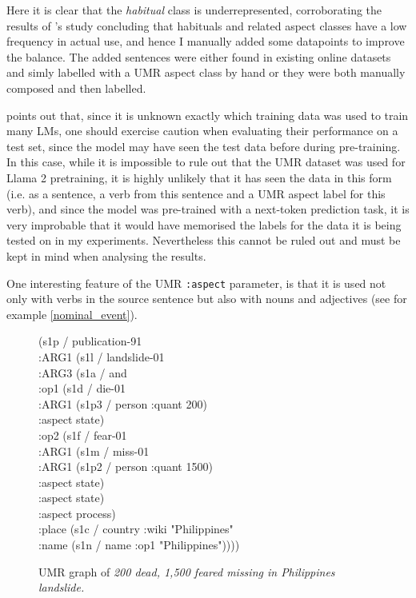 Here it is clear that the \emph{habitual} class is underrepresented, corroborating the results of \citet{Dahl1985TenseAA}'s study concluding that habituals and related aspect classes have a low frequency in actual use, and hence I manually added some datapoints to improve the balance. The added sentences were either found in existing online datasets and simly labelled with a UMR aspect class by hand or they were both manually composed and then labelled.

\citet{törnberg2024best} points out that, since it is unknown exactly which training data was used to train many LMs, one should exercise caution when evaluating their performance on a test set, since the model may have seen the test data before during pre-training. In this case, while it is impossible to rule out that the UMR dataset was used for Llama 2 pretraining, it is highly unlikely that it has seen the data in this form (i.e. as a sentence, a verb from this sentence and a UMR aspect label for this verb), and since the model was pre-trained with a next-token prediction task, it is very improbable that it would have memorised the labels for the data it is being tested on in my experiments. Nevertheless this cannot be ruled out and must be kept in mind when analysing the results.

One interesting feature of the UMR \texttt{:aspect} parameter, is that it is used not only with verbs in the source sentence but also with nouns and adjectives (see for example \ref{nominal_event}).

\begin{figure}[t]
    (s1p / publication-91 \\
    \null\quad :ARG1 (s1l / landslide-01 \\
    \null\quad \quad:ARG3 (s1a / and \\
    \null\quad \quad\quad:op1 (s1d / die-01 \\
    \null\quad \quad\quad\quad:ARG1 (s1p3 / person :quant 200) \\
    \null\quad \quad\quad\quad:aspect state) \\
    \null\quad \quad\quad:op2 (s1f / fear-01 \\
    \null\quad \quad\quad\quad:ARG1 (s1m / miss-01 \\
    \null\quad \quad\quad\quad\quad:ARG1 (s1p2 / person :quant 1500) \\
    \null\quad \quad\quad\quad\quad:aspect state) \\
    \null\quad \quad\quad\quad:aspect state) \\
    \null\quad \quad\quad:aspect process) \\
    \null\quad :place (s1c / country :wiki "Philippines"  \\
    \null\quad \quad:name (s1n / name :op1 "Philippines"))))
    \caption{UMR graph of \emph{200 dead, 1,500 feared missing in Philippines landslide.}}
\end{figure}
\label{nominal_event}


